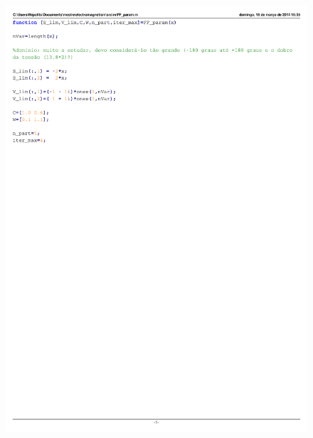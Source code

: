 \documentclass{IEEEtran}
\begin{document}
\begin{figure}
	\centering
	\includegraphics{FF_param.pdf}
	\label{FF_param}
\end{figure}
\end{document}
